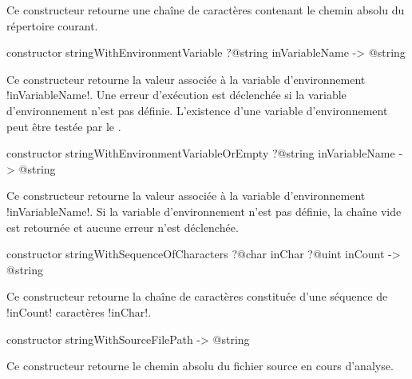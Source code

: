 Ce constructeur retourne une chaîne de caractères contenant le chemin absolu du répertoire courant.





\begin{galgasbox}
constructor stringWithEnvironmentVariable
  ?@string inVariableName
  -> @string
\end{galgasbox}

Ce constructeur retourne la valeur associée à la variable d'environnement \ggs!inVariableName!. Une erreur d'exécution est déclenchée si la variable d'environnement n'est pas définie. L'existence d'une variable d'environnement peut être testée par le .






\begin{galgasbox}
constructor stringWithEnvironmentVariableOrEmpty
  ?@string inVariableName
  -> @string
\end{galgasbox}

Ce constructeur retourne la valeur associée à la variable d'environnement \ggs!inVariableName!. Si la variable d'environnement n'est pas définie, la chaîne vide est retournée et aucune erreur n'est déclenchée.







\begin{galgasbox}
constructor stringWithSequenceOfCharacters
  ?@char inChar
  ?@uint inCount
  -> @string
\end{galgasbox}

Ce constructeur retourne la chaîne de caractères constituée d'une séquence de \ggs!inCount! caractères \ggs!inChar!.






\begin{galgasbox}
constructor stringWithSourceFilePath -> @string
\end{galgasbox}

Ce constructeur retourne le chemin absolu du fichier source en cours d'analyse.






